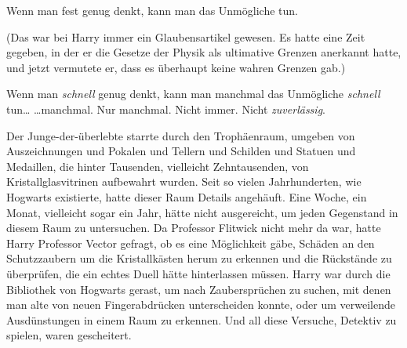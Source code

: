\later

Wenn man fest genug denkt, kann man das Unmögliche tun.

(Das war bei Harry immer ein Glaubensartikel gewesen. Es hatte eine Zeit gegeben, in der er die Gesetze der Physik als ultimative Grenzen anerkannt hatte, und jetzt vermutete er, dass es überhaupt keine wahren Grenzen gab.)




Wenn man \emph{schnell} genug denkt, kann man manchmal das Unmögliche \emph{schnell} tun…
…manchmal. Nur manchmal. Nicht immer. Nicht \emph{zuverlässig}.

Der Junge-der-überlebte starrte durch den Trophäenraum, umgeben von Auszeichnungen und Pokalen und Tellern und Schilden und Statuen und Medaillen, die hinter Tausenden, vielleicht Zehntausenden, von Kristallglasvitrinen aufbewahrt wurden. Seit so vielen Jahrhunderten, wie Hogwarts existierte, hatte dieser Raum Details angehäuft. Eine Woche, ein Monat, vielleicht sogar ein Jahr, hätte nicht ausgereicht, um jeden Gegenstand in diesem Raum zu untersuchen. Da Professor Flitwick nicht mehr da war, hatte Harry Professor Vector gefragt, ob es eine Möglichkeit gäbe, Schäden an den Schutzzaubern um die Kristallkästen herum zu erkennen und die Rückstände zu überprüfen, die ein echtes Duell hätte hinterlassen müssen.
Harry war durch die Bibliothek von Hogwarts gerast, um nach Zaubersprüchen zu suchen, mit denen man alte von neuen Fingerabdrücken unterscheiden konnte, oder um verweilende Ausdünstungen in einem Raum zu erkennen. Und all diese Versuche, Detektiv zu spielen, waren gescheitert.

